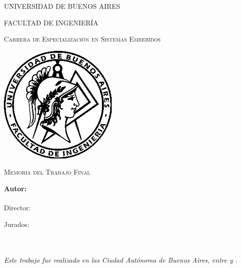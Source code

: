 \documentclass[
11pt, %
spanish,
singlespacing, %
parskip, %
headsepline, %
]{MastersDoctoralThesis}
\author{ Ing. Francisco Suárez }
\begin{document}
\frontmatter 
\pagestyle{plain} 


\begin{titlepage}
\begin{center}

{\scshape\LARGE UNIVERSIDAD DE BUENOS AIRES\par}\vspace{0.1cm} %
{\scshape\LARGE FACULTAD DE INGENIERÍA\par}\vspace{0.1cm} %
{\scshape\LARGE Carrera de Especialización en Sistemas Embebidos\par}\vspace{1cm} %

\includegraphics[width=.3\textwidth]{./Figures/logoFIUBA.png}
\vspace{1cm}

\textsc{\Large Memoria del Trabajo Final}\\[0.5cm] %

{\huge \bfseries \ttitle\par}\vspace{0.4cm} %

\vspace{1cm}
\LARGE\textbf{Autor:\\
\authorname}\\ %

\vspace{1cm}
\large
\vspace{10px}
{Director:} \\
{\supname} %
 
\vspace{1cm}
Jurados:\\
\jurunoname\\
\jurdosname\\
\jurtresname
 
\vfill
\textit{Este trabajo fue realizado en las Ciudad Autónoma de Buenos Aires, entre \fechaINICIOname \hspace{1px} y \fechaFINALname.}
\end{center}
\end{titlepage}
\end{document}
